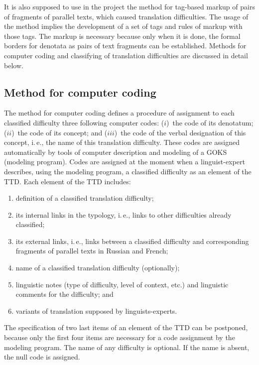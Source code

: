 \begin{multicols}{2}
   It is also supposed to use in the project the method for tag-based markup of pairs of 
fragments of parallel texts, which caused translation difficulties. The usage of the method 
implies the development of a set of tags and rules of markup with those tags. The markup is 
\mbox{necessary} because only when it is done, the formal borders for denotata as pairs of text fragments 
can be established. Methods for computer coding and classifying of 
\mbox{translation} difficulties are discussed in detail below.

\subsection{Method for computer coding}

\noindent
The method for computer coding defines a procedure of assignment to each classified 
difficulty three following computer codes: ($i$)~the code of its denotatum; ($ii$)~the code of its 
concept; and ($iii$)~the code of the verbal \mbox{designation} of this concept, i.\,e., the name of this 
translation difficulty. These codes are assigned \mbox{automatically} by tools of computer description 
and modeling of a GOKS (modeling program). Codes are assigned at the moment when a 
linguist-expert describes, using the modeling program, a classified difficulty as an element of the 
TTD. Each element of the TTD includes:
   \begin{enumerate}[(1)]
\item definition of a classified translation difficulty;
\item its internal links in the typology, i.\,e., links to other difficulties already 
classified;
\item its external links, i.\,e., links between a classified difficulty and corresponding 
fragments of parallel texts in Russian and French;
\item name of a classified translation difficulty (optionally);
\item linguistic notes (type of difficulty, level of context, etc.) and linguistic 
comments for the difficulty; and
\item variants of translation supposed by linguists-experts.
\end{enumerate}

   The specification of two last items of an element of the TTD can be postponed, because only 
the first four items are necessary for a code assignment by the modeling program. The name of 
any difficulty is optional. If the name is absent, the null code is assigned.
   

\end{multicols}
